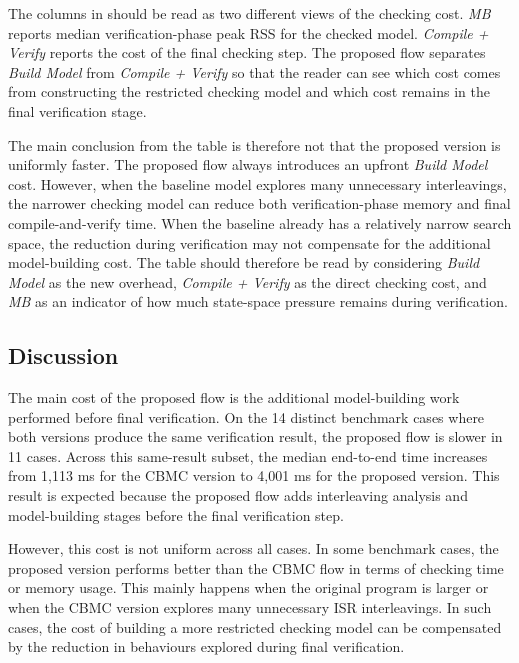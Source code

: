 The columns in  should be read as two
different views of the checking cost. \emph{MB} reports median
verification-phase peak RSS for the checked model. \emph{Compile + Verify}
reports the cost of the final checking step. The proposed flow separates
\emph{Build Model} from \emph{Compile + Verify} so that the reader can see
which cost comes from constructing the restricted checking model and which
cost remains in the final verification stage.

The main conclusion from the table is therefore not that the proposed version
is uniformly faster. The proposed flow always introduces an upfront
\emph{Build Model} cost. However, when the baseline model explores many
unnecessary interleavings, the narrower checking model can reduce both
verification-phase memory and final compile-and-verify time. When the
baseline already has a relatively narrow search space, the reduction during
verification may not compensate for the additional model-building cost. The
table should therefore be read by considering \emph{Build Model} as the new
overhead, \emph{Compile + Verify} as the direct checking cost, and
\emph{MB} as an indicator of how much state-space pressure remains during
verification.

\subsection{Discussion}

The main cost of the proposed flow is the additional model-building work
performed before final verification. On the 14 distinct benchmark cases where
both versions produce the same verification result, the proposed flow is
slower in 11 cases. Across this same-result subset, the median end-to-end
time increases from 1,113 ms for the CBMC version to 4,001 ms for the
proposed version. This result is expected because the proposed flow adds
interleaving analysis and model-building stages before the final verification
step.

However, this cost is not uniform across all cases. In some benchmark cases, the proposed version performs better than the CBMC flow in terms of checking time or memory usage. This mainly happens when the original program is larger or when the CBMC version explores many unnecessary ISR interleavings. In such cases, the cost of building a more restricted checking model can be compensated by the reduction in behaviours explored during final verification.

